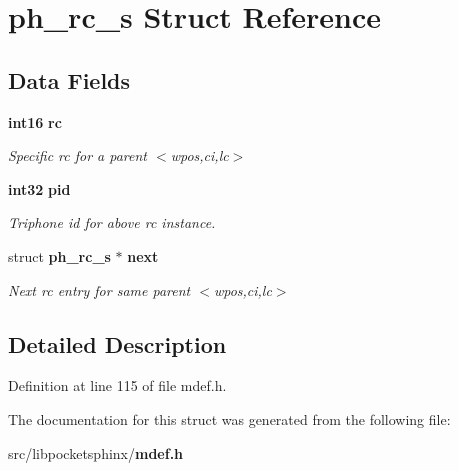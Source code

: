 \section{ph\-\_\-rc\-\_\-s \-Struct \-Reference}
\label{structph__rc__s}
\subsection*{\-Data \-Fields}
\begin{DoxyCompactItemize}
\item 
{\bf int16} {\bf rc}\label{structph__rc__s_ab0f0852e254c04a1cb11de805b698733}

\begin{DoxyCompactList}\small\item\em \-Specific rc for a parent $<$wpos,ci,lc$>$ \end{DoxyCompactList}\item 
{\bf int32} {\bf pid}\label{structph__rc__s_a9762d0f7b4b9f284fd2b3ff735b4256b}

\begin{DoxyCompactList}\small\item\em \-Triphone id for above rc instance. \end{DoxyCompactList}\item 
struct {\bf ph\-\_\-rc\-\_\-s} $\ast$ {\bf next}\label{structph__rc__s_ae05aead721c5cfdd27ac90378bb80f3c}

\begin{DoxyCompactList}\small\item\em \-Next rc entry for same parent $<$wpos,ci,lc$>$ \end{DoxyCompactList}\end{DoxyCompactItemize}


\subsection{\-Detailed \-Description}


\-Definition at line 115 of file mdef.\-h.



\-The documentation for this struct was generated from the following file\-:\begin{DoxyCompactItemize}
\item 
src/libpocketsphinx/{\bf mdef.\-h}\end{DoxyCompactItemize}
